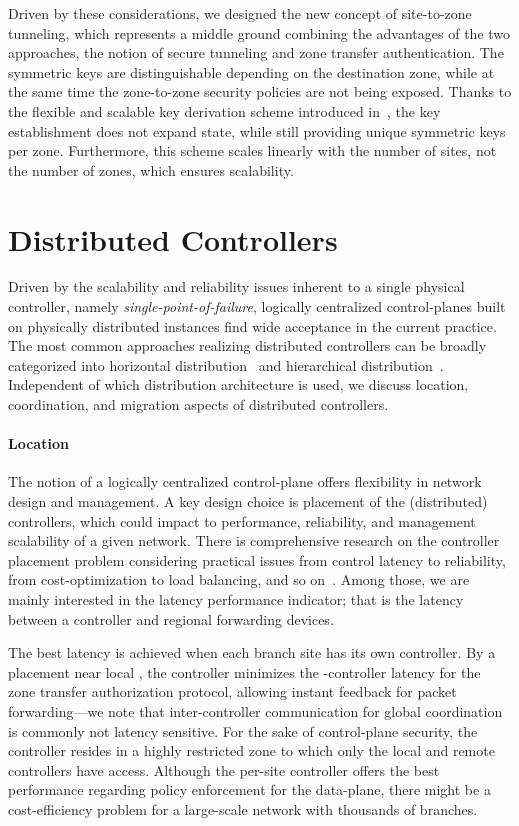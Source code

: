 Driven by these considerations, we designed the new concept of site-to-zone
tunneling, which represents a middle ground combining the advantages of the two
approaches, the notion of secure tunneling and zone transfer authentication. The
symmetric keys are distinguishable depending on the destination zone, while at
the same time the zone-to-zone security policies are not being exposed. Thanks
to the flexible and scalable key derivation scheme introduced
in~\cite{rot2020piskes}, the key establishment does not expand state, while
still providing unique symmetric keys per zone. Furthermore, this scheme scales
linearly with the number of sites, not the number of zones, which ensures
scalability.

\section{Distributed Controllers}
\label{sec:distributedcontroller}
Driven by the scalability and reliability issues inherent to a single physical
controller, namely \textit{single-point-of-failure}, logically centralized
control-planes built on physically distributed instances find wide acceptance in
the current practice. The most common approaches realizing distributed
controllers can be broadly categorized into horizontal
distribution~\cite{berde2014onos,medved2014opendaylight} and hierarchical
distribution~\cite{hassas2012kandoo,yap2017taking}. Independent of which
distribution architecture is used, we discuss location, coordination, and
migration aspects of distributed controllers.

\paragraph{Location}
The notion of a logically centralized control-plane offers flexibility in
network design and management. A key design choice is placement of the
(distributed) controllers, which could impact to performance, reliability, and
management scalability of a given network. There is comprehensive research on
the controller placement problem considering practical issues from control
latency to reliability, from cost-optimization to load balancing, and so
on~\cite{das2019survey,zhang2017role,he2019toward}. Among those, we are mainly
interested in the latency performance indicator; that is the latency between a
controller and regional forwarding devices.

The best latency is achieved when each branch site has its own controller. By a
placement near local \tps, the controller minimizes the \tp-controller latency
for the zone transfer authorization protocol, allowing instant feedback for
packet forwarding---we note that inter-controller communication for global
coordination is commonly not latency sensitive. For the sake of control-plane
security, the controller resides in a highly restricted zone to which only the
local \tps and remote controllers have access. Although the per-site controller
offers the best performance regarding policy enforcement for the data-plane,
there might be a cost-efficiency problem for a large-scale network with
thousands of branches.

